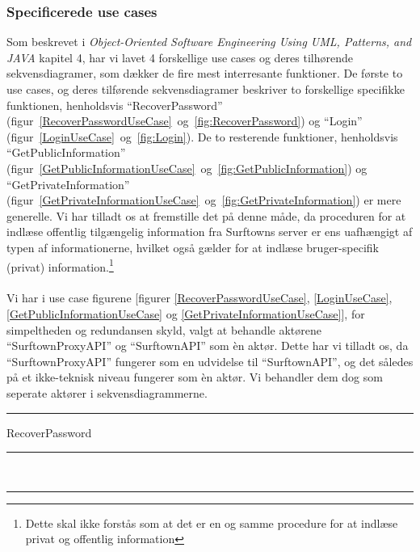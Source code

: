 \documentclass[12pt]{article}
\begin{document}
\subsubsection*{Specificerede use cases}
Som beskrevet i \emph{Object-Oriented Software Engineering Using UML, Patterns, and JAVA}\cite{OOSE} kapitel 4, har vi lavet 4 forskellige use cases og deres tilhørende sekvensdiagramer, som dækker de fire mest interresante funktioner. De første to use cases, og deres tilførende sekvensdiagramer beskriver to forskellige specifikke funktionen, henholdsvis ``RecoverPassword'' (figur~\ref{RecoverPasswordUseCase}~og~\ref{fig:RecoverPassword}) og ``Login'' (figur~\ref{LoginUseCase}~og~\ref{fig:Login}). De to resterende funktioner, henholdsvis ``GetPublicInformation'' (figur~\ref{GetPublicInformationUseCase}~og~\ref{fig:GetPublicInformation}) og ``GetPrivateInformation'' (figur~\ref{GetPrivateInformationUseCase}~og~\ref{fig:GetPrivateInformation}) er mere generelle. Vi har tilladt os at fremstille det på denne måde, da proceduren for at indlæse offentlig tilgængelig information fra Surftowns server er ens uafhængigt af typen af informationerne, hvilket også gælder for at indlæse bruger-specifik (privat) information.\footnote{Dette skal ikke forstås som at det er en og samme procedure for at indlæse privat og offentlig information}\\\\
Vi har i use case figurene [figurer \ref{RecoverPasswordUseCase}, \ref{LoginUseCase}, \ref{GetPublicInformationUseCase} og \ref{GetPrivateInformationUseCase}], for simpeltheden og redundansen skyld, valgt at behandle aktørene ``SurftownProxyAPI'' og ``SurftownAPI'' som èn aktør. Dette har vi tilladt os, da ``SurftownProxyAPI'' fungerer som en udvidelse til ``SurftownAPI'', og det således på et ikke-teknisk niveau fungerer som èn aktør. Vi behandler dem dog som seperate aktører i sekvensdiagrammerne.
\newpage
	\hspace{-20pt}
	\rule{430pt}{1.0pt}
	 RecoverPassword\\
	\rule{430pt}{0.4pt}
	\\
	\rule{430pt}{0.4pt}
\end{document}
